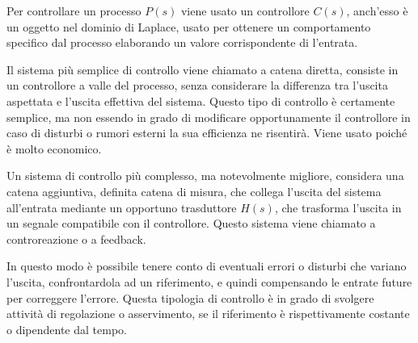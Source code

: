 \documentclass{article}
\numberwithin{equation}{subsection}
\begin{document}
Per controllare un processo $P(s)$ viene usato un controllore $C(s)$, anch'esso è un oggetto nel dominio di Laplace, usato per ottenere un comportamento specifico dal processo 
elaborando un valore corrispondente di l'entrata. 



Il sistema più semplice di controllo viene chiamato a catena diretta, consiste in un controllore a valle del processo, senza considerare la differenza tra l'uscita aspettata 
e l'uscita effettiva del sistema. Questo tipo di controllo è certamente semplice, ma non essendo in grado di modificare opportunamente il controllore in caso di disturbi o 
rumori esterni la sua efficienza ne risentirà. Viene usato poiché è molto economico. 

\begin{center}
\end{center}

Un sistema di controllo più complesso, ma notevolmente migliore, considera una catena aggiuntiva, definita catena di misura, che collega l'uscita del sistema all'entrata 
mediante un opportuno trasduttore $H(s)$, che trasforma l'uscita in un segnale compatibile con il controllore. Questo sistema viene chiamato a controreazione o a feedback. 

In questo modo è possibile tenere conto di eventuali 
errori o disturbi che variano l'uscita, confrontardola ad un riferimento, e quindi compensando le entrate future per correggere l'errore. Questa tipologia di controllo è 
in grado di svolgere attività di regolazione o asservimento, se il riferimento è rispettivamente costante o dipendente dal tempo. 
\end{document}
